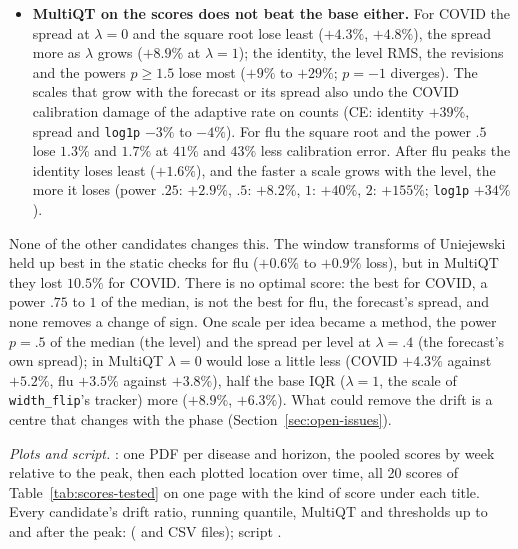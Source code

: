 \documentclass[11pt,a4paper]{article}
\theoremstyle{definition}
\theoremstyle{remark}
\begin{document}
\begin{itemize}[leftmargin=*,itemsep=3pt]
$-6.0\%$); for COVID the thresholds of each phase, learned largely on the
first winter, miss the second, and the calibration error grows.
\item \textbf{MultiQT on the scores does not beat the base either.} For
COVID the spread at $\lambda=0$ and the square root lose least ($+4.3\%$,
$+4.8\%$), the spread more as $\lambda$ grows ($+8.9\%$ at $\lambda=1$);
the identity, the level RMS, the revisions and the powers $p\ge1.5$ lose
most ($+9\%$ to $+29\%$; $p=-1$ diverges). The scales that grow with the
forecast or its spread also undo the COVID calibration damage of the
adaptive rate on counts (CE: identity $+39\%$, spread and \texttt{log1p}
$-3\%$ to $-4\%$). For flu the square root and the power $.5$ lose
$1.3\%$ and $1.7\%$ at $41\%$ and $43\%$ less calibration error. After
flu peaks the identity loses least ($+1.6\%$), and the faster a scale
grows with the level, the more it loses (power $.25$: $+2.9\%$, $.5$:
$+8.2\%$, $1$: $+40\%$, $2$: $+155\%$; \texttt{log1p} $+34\%$).
\end{itemize}
None of the other candidates changes this. The window transforms of
Uniejewski~\cite{vst} held up best in the static checks for flu ($+0.6\%$
to $+0.9\%$ loss), but in MultiQT they lost $10.5\%$ for COVID. There is
no optimal score: the best for COVID, a power $.75$ to $1$ of the median,
is not the best for flu, the forecast's spread, and none removes a change
of sign. One scale per idea became a method, the power $p=.5$ of the median
(the level) and the spread per level at $\lambda=.4$ (the forecast's own
spread); in MultiQT $\lambda=0$ would lose a little less (COVID $+4.3\%$
against $+5.2\%$, flu $+3.5\%$ against $+3.8\%$), half the base IQR
($\lambda=1$, the scale of \texttt{width\_flip}'s tracker) more ($+8.9\%$,
$+6.3\%$). What could remove the drift is a centre that changes with the
phase (Section~\ref{sec:open-issues}).

\emph{Plots and script.} : one PDF per
disease and horizon, the pooled scores by week relative to the peak, then
each plotted location over time, all 20 scores of
Table~\ref{tab:scores-tested} on one page with the kind of score under each
title. Every candidate's drift ratio, running quantile, MultiQT and
thresholds up to and after the peak: 
( and CSV files); script .
\end{document}
